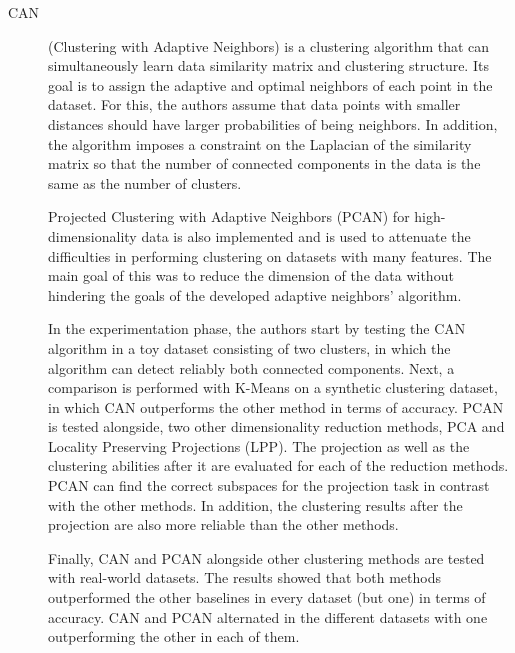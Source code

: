 \begin{description}
    \item[CAN]\cite{Nie.Wang.ea_Clusteringprojectedclustering_2014a} (Clustering with Adaptive Neighbors) is a clustering algorithm that can simultaneously learn data similarity matrix and clustering structure. Its goal is to assign the adaptive and optimal neighbors of each point in the dataset. For this, the authors assume that data points with smaller distances should have larger probabilities of being neighbors. In addition, the algorithm imposes a constraint on the Laplacian of the similarity matrix so that the number of connected components in the data is the same as the number of clusters.
    
    Projected Clustering with Adaptive Neighbors (PCAN) for high-dimensionality data is also implemented and is used to attenuate the difficulties in performing clustering on datasets with many features. The main goal of this was to reduce the dimension of the data without hindering the goals of the developed adaptive neighbors' algorithm.

    In the experimentation phase, the authors start by testing the CAN algorithm in a toy dataset consisting of two clusters, in which the algorithm can detect reliably both connected components. Next, a comparison is performed with K-Means on a synthetic clustering dataset, in which CAN outperforms the other method in terms of accuracy. PCAN is tested alongside, two other dimensionality reduction methods, PCA and Locality Preserving Projections (LPP). The projection as well as the clustering abilities after it are evaluated for each of the reduction methods. PCAN can find the correct subspaces for the projection task in contrast with the other methods. In addition, the clustering results after the projection are also more reliable than the other methods. 

    Finally, CAN and PCAN alongside other clustering methods are tested with real-world datasets. The results showed that both methods outperformed the other baselines in every dataset (but one) in terms of accuracy. CAN and PCAN alternated in the different datasets with one outperforming the other in each of them.
\end{description}

\begin{description}
    \item[] 
\end{description}






